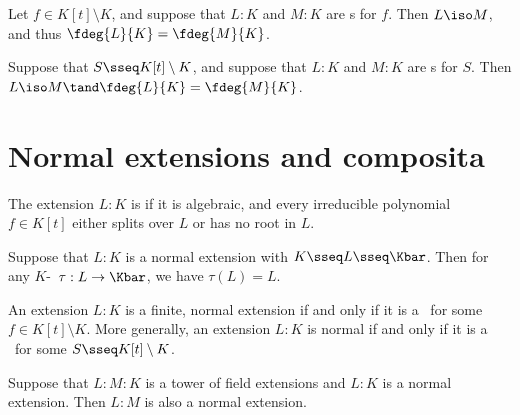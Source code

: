 \documentclass{article}
\begin{document}
  \begin{ttheorem}
    Let $ f\in K[t]\setminus K $, and suppose that $ L:K $ and $ M:K $ are \sfe s for $ f $.
    Then $ L\iso M $, and thus $ \fdeg{L}{K}=\fdeg{M}{K} $.
  \end{ttheorem}

  \begin{ttheorem}
    Suppose that $ S\sseq K[t]\setminus K $, and suppose that $ L:K $ and $ M:K $ are \sfe s for $ S $.
    Then $ L\iso M\tand \fdeg{L}{K}=\fdeg{M}{K} $.
  \end{ttheorem}

\section{Normal extensions and composita}
  \begin{tdefinition}
    The extension $ L:K $ is  if it is algebraic, and every irreducible polynomial $ f\in K[t] $ either splits over $ L $ or has no root in $ L $.
  \end{tdefinition}

  \begin{tproposition}
    Suppose that $ L:K $ is a normal extension with $ K\sseq L\sseq \Kbar $.
    Then for any $ K $-\homo~$ \tau:L\to \Kbar $, we have $ \tau(L) = L $.
  \end{tproposition}

  \begin{tproposition}
    An extension $ L:K $ is a finite, normal extension if and only if it is a \sfe~for some $ f\in K[t]\setminus K $.
    More generally, an extension $ L:K $ is normal if and only if it is a \sfe~for some $ S\sseq K[t]\setminus K $.
  \end{tproposition}

  \begin{tproposition}
    Suppose that $ L:M:K $ is a tower of field extensions and $ L:K $ is a normal extension.
    Then $ L:M $ is also a normal extension.
  \end{tproposition}
\end{document}
